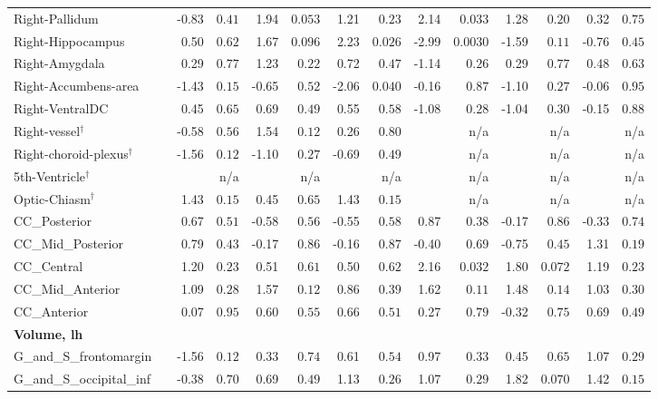 {\begin{longtable}{llrrrrrrrrrrrr}
Right-Pallidum &  & -0.83 & $0.41$ & 1.94 & $0.053$ & 1.21 & $0.23$ & 2.14 & $0.033$ & 1.28 & $0.20$ & 0.32 & $0.75$ \\
Right-Hippocampus &  & 0.50 & $0.62$ & 1.67 & $0.096$ & 2.23 & $0.026$ & -2.99 & $0.0030$ & -1.59 & $0.11$ & -0.76 & $0.45$ \\
Right-Amygdala &  & 0.29 & $0.77$ & 1.23 & $0.22$ & 0.72 & $0.47$ & -1.14 & $0.26$ & 0.29 & $0.77$ & 0.48 & $0.63$ \\
Right-Accumbens-area &  & -1.43 & $0.15$ & -0.65 & $0.52$ & -2.06 & $0.040$ & -0.16 & $0.87$ & -1.10 & $0.27$ & -0.06 & $0.95$ \\
Right-VentralDC &  & 0.45 & $0.65$ & 0.69 & $0.49$ & 0.55 & $0.58$ & -1.08 & $0.28$ & -1.04 & $0.30$ & -0.15 & $0.88$ \\
Right-vessel$^{\dagger}$ &  & -0.58 & $0.56$ & 1.54 & $0.12$ & 0.26 & $0.80$ &  & n/a &  & n/a &  & n/a \\
Right-choroid-plexus$^{\dagger}$ &  & -1.56 & $0.12$ & -1.10 & $0.27$ & -0.69 & $0.49$ &  & n/a &  & n/a &  & n/a \\
5th-Ventricle$^{\dagger}$ &  &  & n/a &  & n/a &  & n/a &  & n/a &  & n/a &  & n/a \\
Optic-Chiasm$^{\dagger}$ &  & 1.43 & $0.15$ & 0.45 & $0.65$ & 1.43 & $0.15$ &  & n/a &  & n/a &  & n/a \\
CC\_Posterior &  & 0.67 & $0.51$ & -0.58 & $0.56$ & -0.55 & $0.58$ & 0.87 & $0.38$ & -0.17 & $0.86$ & -0.33 & $0.74$ \\
CC\_Mid\_Posterior &  & 0.79 & $0.43$ & -0.17 & $0.86$ & -0.16 & $0.87$ & -0.40 & $0.69$ & -0.75 & $0.45$ & 1.31 & $0.19$ \\
CC\_Central &  & 1.20 & $0.23$ & 0.51 & $0.61$ & 0.50 & $0.62$ & 2.16 & $0.032$ & 1.80 & $0.072$ & 1.19 & $0.23$ \\
CC\_Mid\_Anterior &  & 1.09 & $0.28$ & 1.57 & $0.12$ & 0.86 & $0.39$ & 1.62 & $0.11$ & 1.48 & $0.14$ & 1.03 & $0.30$ \\
CC\_Anterior &  & 0.07 & $0.95$ & 0.60 & $0.55$ & 0.66 & $0.51$ & 0.27 & $0.79$ & -0.32 & $0.75$ & 0.69 & $0.49$ \\
\midrule\multicolumn{14}{l}{\textbf{Volume, lh}} \\
G\_and\_S\_frontomargin &  & -1.56 & $0.12$ & 0.33 & $0.74$ & 0.61 & $0.54$ & 0.97 & $0.33$ & 0.45 & $0.65$ & 1.07 & $0.29$ \\
G\_and\_S\_occipital\_inf &  & -0.38 & $0.70$ & 0.69 & $0.49$ & 1.13 & $0.26$ & 1.07 & $0.29$ & 1.82 & $0.070$ & 1.42 & $0.15$ \\

\end{longtable}}
